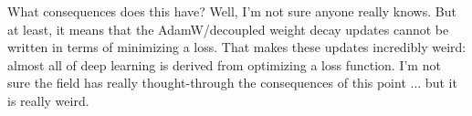 \documentclass{article}
\newcommand{\bracket}[3]{\left#1 #3 \right#2}
\newcommand{\ab}{\bracket{\langle}{\rangle}}
\newcommand{\0}{\mathbf{0}}
\newcommand{\greg}{g_\text{reg}}
\newcommand{\gunreg}{g_\text{unreg}}
\begin{document}
What consequences does this have?
Well, I'm not sure anyone really knows.
But at least, it means that the AdamW/decoupled weight decay updates cannot be written in terms of minimizing a loss.
That makes these updates incredibly weird: almost all of deep learning is derived from optimizing a loss function.
I'm not sure the field has really thought-through the consequences of this point ... but it is really weird.





\newpage
\end{document}
